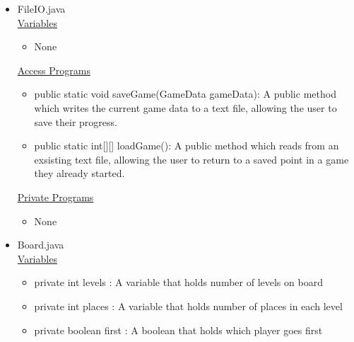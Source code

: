 \documentclass[12pt]{article}
\begin{document}
\begin{itemize}
\item FileIO.java \\
\underline{Variables}
\begin{itemize}
	\item None
\end{itemize}
\underline{Access Programs}
\begin{itemize}
	\item public static void saveGame(GameData gameData): A public method which writes the current game data to a text file, allowing the user to save their progress.
	\item public static int[][] loadGame(): A public method which reads from an exsisting text file, allowing the user to return to a saved point in a game they already started.
\end{itemize}
\underline{Private Programs}
\begin{itemize}
	\item None
\end{itemize}




\item Board.java \\
\underline{Variables}
\begin{itemize}
	\item private int levels : A variable that holds number of levels on board
	\item private int places : A variable that holds number of places in each level 
	\item private boolean first : A boolean that holds which player goes first
	

\end{itemize}
\end{itemize}
\end{document}
